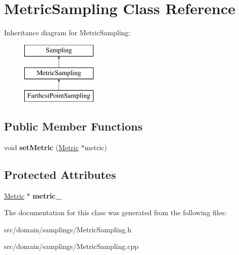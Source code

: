 \hypertarget{class_metric_sampling}{}\section{Metric\+Sampling Class Reference}
\label{class_metric_sampling}
Inheritance diagram for Metric\+Sampling\+:\begin{figure}[H]
\begin{center}
\leavevmode
\includegraphics[height=3.000000cm]{class_metric_sampling}
\end{center}
\end{figure}
\subsection*{Public Member Functions}
\begin{DoxyCompactItemize}
\item 
\hypertarget{class_metric_sampling_aff86fe5597a6d0f49f07595cd2770296}{}void {\bfseries set\+Metric} (\hyperlink{class_metric}{Metric} $\ast$metric)\label{class_metric_sampling_aff86fe5597a6d0f49f07595cd2770296}

\end{DoxyCompactItemize}
\subsection*{Protected Attributes}
\begin{DoxyCompactItemize}
\item 
\hypertarget{class_metric_sampling_a5374fd52d959aece73b748e4d45ca328}{}\hyperlink{class_metric}{Metric} $\ast$ {\bfseries metric\+\_\+}\label{class_metric_sampling_a5374fd52d959aece73b748e4d45ca328}

\end{DoxyCompactItemize}


The documentation for this class was generated from the following files\+:\begin{DoxyCompactItemize}
\item 
src/domain/samplings/Metric\+Sampling.\+h\item 
src/domain/samplings/Metric\+Sampling.\+cpp\end{DoxyCompactItemize}
